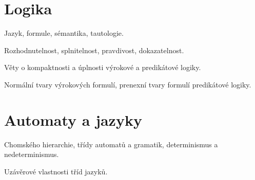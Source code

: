 \section{Logika}
\begin{pozadavky}
\begin{pitemize}
\item Jazyk, formule, sémantika, tautologie.
\item Rozhodnutelnost, splnitelnost, pravdivost, dokazatelnost.
\item Věty o kompaktnosti a úplnosti výrokové a predikátové logiky.
\item Normální tvary výrokových formulí, prenexní tvary formulí predikátové logiky.
\end{pitemize}
\end{pozadavky}





\section{Automaty a jazyky}
\begin{pozadavky}
\begin{pitemize}
\item Chomského hierarchie, třídy automatů a gramatik, determinismus a nedeterminismus.
\item Uzávěrové vlastnosti tříd jazyků.
\end{pitemize}
\end{pozadavky}




